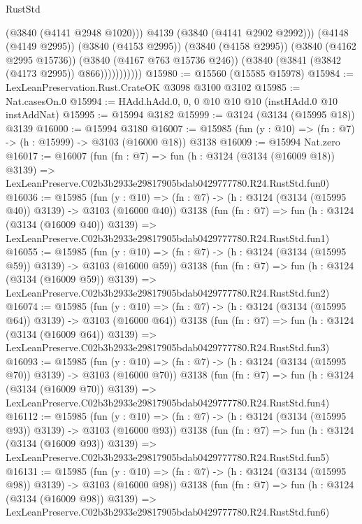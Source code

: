 \begin{lexlean}{RustStd}
\begin{coremodule}
                          (@3840 (@4141 @2948 @1020)))
                        @4139
                        (@3840 (@4141 @2902 @2992)))
                      (@4148 (@4149 @2995))
                      (@3840 (@4153 @2995))
                      (@3840 (@4158 @2995))
                      (@3840 (@4162 @2995 @15736))
                      (@3840 (@4167 @763 @15736 @246))
                      (@3840 (@3841 (@3842 (@4173 @2995)) @866)))))))))))
@15980 := @15560 (@15585 @15978)
@15984 := LexLeanPreservation.Rust.CrateOK @3098 @3100 @3102
@15985 := Nat.casesOn.{0}
@15994 := HAdd.hAdd.{0, 0, 0} @10 @10 @10 (instHAdd.{0} @10 instAddNat)
@15995 := @15994 @3182
@15999 := @3124 (@3134 (@15995 @18)) @3139
@16000 := @15994 @3180
@16007 := @15985 (fun (y : @10) => (fn : @7) -> (h : @15999) -> @3103 (@16000 @18)) @3138
@16009 := @15994 Nat.zero
@16017 := @16007
    (fun (fn : @7) =>
    fun (h : @3124 (@3134 (@16009 @18)) @3139) =>
    LexLeanPreserve.C02b3b2933e29817905bdab0429777780.R24.RustStd.fun0)
@16036 := @15985
    (fun (y : @10) => (fn : @7) -> (h : @3124 (@3134 (@15995 @40)) @3139) -> @3103 (@16000 @40))
    @3138
    (fun (fn : @7) =>
    fun (h : @3124 (@3134 (@16009 @40)) @3139) =>
    LexLeanPreserve.C02b3b2933e29817905bdab0429777780.R24.RustStd.fun1)
@16055 := @15985
    (fun (y : @10) => (fn : @7) -> (h : @3124 (@3134 (@15995 @59)) @3139) -> @3103 (@16000 @59))
    @3138
    (fun (fn : @7) =>
    fun (h : @3124 (@3134 (@16009 @59)) @3139) =>
    LexLeanPreserve.C02b3b2933e29817905bdab0429777780.R24.RustStd.fun2)
@16074 := @15985
    (fun (y : @10) => (fn : @7) -> (h : @3124 (@3134 (@15995 @64)) @3139) -> @3103 (@16000 @64))
    @3138
    (fun (fn : @7) =>
    fun (h : @3124 (@3134 (@16009 @64)) @3139) =>
    LexLeanPreserve.C02b3b2933e29817905bdab0429777780.R24.RustStd.fun3)
@16093 := @15985
    (fun (y : @10) => (fn : @7) -> (h : @3124 (@3134 (@15995 @70)) @3139) -> @3103 (@16000 @70))
    @3138
    (fun (fn : @7) =>
    fun (h : @3124 (@3134 (@16009 @70)) @3139) =>
    LexLeanPreserve.C02b3b2933e29817905bdab0429777780.R24.RustStd.fun4)
@16112 := @15985
    (fun (y : @10) => (fn : @7) -> (h : @3124 (@3134 (@15995 @93)) @3139) -> @3103 (@16000 @93))
    @3138
    (fun (fn : @7) =>
    fun (h : @3124 (@3134 (@16009 @93)) @3139) =>
    LexLeanPreserve.C02b3b2933e29817905bdab0429777780.R24.RustStd.fun5)
@16131 := @15985
    (fun (y : @10) => (fn : @7) -> (h : @3124 (@3134 (@15995 @98)) @3139) -> @3103 (@16000 @98))
    @3138
    (fun (fn : @7) =>
    fun (h : @3124 (@3134 (@16009 @98)) @3139) =>
    LexLeanPreserve.C02b3b2933e29817905bdab0429777780.R24.RustStd.fun6)

\end{coremodule}
\end{lexlean}
